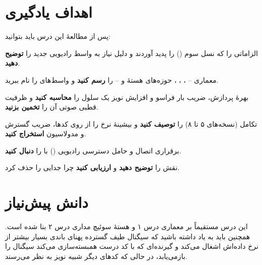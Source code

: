 \documentclass[11pt,a4paper]{article}
\begin{document}
\ACNcover

\section{اهداف یادگیری}
پس از مطالعهٔ این درس باید بتوانید:
\begin{objectives}
  \item الزاماتی را که نسل سوم () را پدید آوردند و دلیل نیاز به واسط رادیویی جدید
         را \textbf{توضیح دهید}.
  \item معماری  -- ، ، ، حوزه‌های هستهٔ  و  -- را
        \textbf{رسم کنید} و واسط‌های  را نام ببرید.
  \item بهرهٔ پردازش، ضریب بار فراسو و افزایش نویز یک سلول  را \textbf{محاسبه کنید} و
        ظرفیت قطبی صوتی آن را \textbf{تخمین بزنید}.
  \item تکامل  (نسخه‌های ۵ تا ۸) را \textbf{توصیف کنید} و بیشینهٔ نرخ  را از
        روی کدها، ضریب گسترش و مدولاسیون \textbf{استخراج کنید}.
  \item برقراری اتصال  و حامل دسترسی رادیویی () با  را
        \textbf{دنبال کنید}.
  \item نقش  را \textbf{توضیح دهید} و \textbf{ارزیابی کنید} چرا  جدایی
         را حذف کرد.
\end{objectives}

\section{دانش پیش‌نیاز}
این درس مستقیماً بر معماری  درس ۱ و هستهٔ سوئیچ مداری درس ۲ بنا شده است. همچنین
باید به یاد داشته باشید که سیگنال طیف گسترده پهنای باندی بسیار بیشتر از نرخ داده‌اش اشغال
می‌کند و گیرنده‌ای که با کد درست همبسته‌سازی می‌کند سیگنال را بازمی‌یابد، در حالی که کدهای
دیگر شبیه نویز به نظر می‌رسند.
\end{document}
